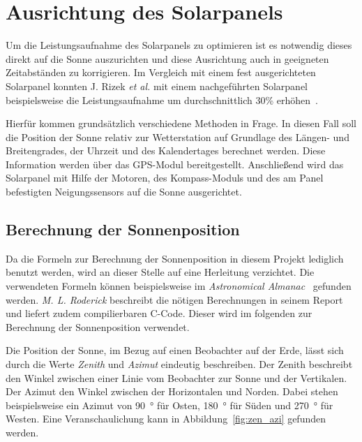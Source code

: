 \pagebreak
\section{Ausrichtung des Solarpanels}\label{sec:ausrichtung des Solarpanels}
Um die Leistungsaufnahme des Solarpanels zu optimieren ist es notwendig dieses direkt auf die Sonne auszurichten und diese Ausrichtung auch in geeigneten Zeitabständen zu korrigieren. Im Vergleich mit einem fest ausgerichteten Solarpanel konnten J. Rizek \emph{et al.} mit einem nachgeführten Solarpanel beispielsweise die Leistungsaufnahme um durchschnittlich 30\% erhöhen~\cite{Rizek2008}.

Hierfür kommen grundsätzlich verschiedene Methoden in Frage. In diesen Fall soll die Position der Sonne relativ zur Wetterstation auf Grundlage des Längen- und Breitengrades, der Uhrzeit und des Kalendertages berechnet werden. Diese Information werden über das GPS-Modul bereitgestellt. Anschließend wird das Solarpanel mit Hilfe der Motoren, des Kompass-Moduls und des am Panel befestigten Neigungssensors auf die Sonne ausgerichtet.

\subsection{Berechnung der Sonnenposition}\label{sec:berechnung_der_sonnenposition}
Da die Formeln zur Berechnung der Sonnenposition in diesem Projekt lediglich benutzt werden, wird an dieser Stelle auf eine Herleitung verzichtet. Die verwendeten Formeln können beispielsweise im \emph{Astronomical Almanac}~\cite{Anon1984} gefunden werden. \emph{M. L. Roderick} beschreibt die nötigen Berechnungen in seinem Report~\cite{Roderick1992} und liefert zudem compilierbaren C-Code. Dieser wird im folgenden zur Berechnung der Sonnenposition verwendet.

Die Position der Sonne, im Bezug auf einen Beobachter auf der Erde, lässt sich durch die Werte \emph{Zenith} und \emph{Azimut} eindeutig beschreiben. Der Zenith beschreibt den Winkel zwischen einer Linie vom Beobachter zur Sonne und der Vertikalen. Der Azimut den Winkel zwischen der Horizontalen und Norden. Dabei stehen beispielsweise ein Azimut von \SI{90}{\degree} für Osten, \SI{180}{\degree} für Süden und \SI{270}{\degree} für Westen. Eine Veranschaulichung kann in Abbildung~\ref{fig:zen_azi} gefunden werden.

